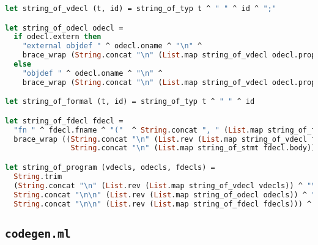 \begin{lstlisting}[language=Caml,backgroundcolor=\color{backgroundcolor}]
let string_of_vdecl (t, id) = string_of_typ t ^ " " ^ id ^ ";"

let string_of_odecl odecl =
  if odecl.extern then
    "external objdef " ^ odecl.oname ^ "\n" ^
    brace_wrap (String.concat "\n" (List.map string_of_vdecl odecl.props))
  else
    "objdef " ^ odecl.oname ^ "\n" ^
    brace_wrap (String.concat "\n" (List.map string_of_vdecl odecl.props))

let string_of_formal (t, id) = string_of_typ t ^ " " ^ id

let string_of_fdecl fdecl =
  "fn " ^ fdecl.fname ^ "("  ^ String.concat ", " (List.map string_of_formal fdecl.formals) ^ ") -> " ^ string_of_typ fdecl.typ ^ "\n" ^
  brace_wrap ((String.concat "\n" (List.rev (List.map string_of_vdecl fdecl.locals))) ^ "\n\n" ^
               String.concat "\n" (List.map string_of_stmt fdecl.body))

let string_of_program (vdecls, odecls, fdecls) =
  String.trim
  (String.concat "\n" (List.rev (List.map string_of_vdecl vdecls)) ^ "\n" ^
  String.concat "\n\n" (List.rev (List.map string_of_odecl odecls)) ^ "\n" ^
  String.concat "\n\n" (List.rev (List.map string_of_fdecl fdecls))) ^ "\n"
\end{lstlisting}

\subsection{\texttt{codegen.ml}}

